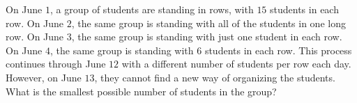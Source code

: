 On June $1$, a group of students are standing in rows, with $15$ students in each row. On June $2$, the same group is standing with all of the students in one long row. On June $3$, the same group is standing with just one student in each row. On June $4$, the same group is standing with $6$ students in each row. This process continues through June $12$ with a different number of students per row each day. However, on June $13$, they cannot find a new way of organizing the students. What is the smallest possible number of students in the group?
